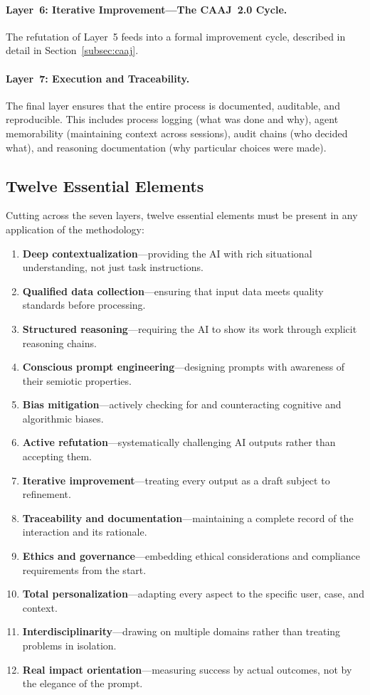 \documentclass[11pt,a4paper]{article}
\begin{document}
\paragraph{Layer~6: Iterative Improvement---The CAAJ~2.0 Cycle.} The refutation of Layer~5 feeds into a formal improvement cycle, described in detail in Section~\ref{subsec:caaj}.

\paragraph{Layer~7: Execution and Traceability.} The final layer ensures that the entire process is documented, auditable, and reproducible. This includes process logging (what was done and why), agent memorability (maintaining context across sessions), audit chains (who decided what), and reasoning documentation (why particular choices were made).

\subsection{Twelve Essential Elements}

Cutting across the seven layers, twelve essential elements must be present in any application of the methodology:

\begin{enumerate}[label=\arabic*.]
    \item \textbf{Deep contextualization}---providing the AI with rich situational understanding, not just task instructions.
    \item \textbf{Qualified data collection}---ensuring that input data meets quality standards before processing.
    \item \textbf{Structured reasoning}---requiring the AI to show its work through explicit reasoning chains.
    \item \textbf{Conscious prompt engineering}---designing prompts with awareness of their semiotic properties.
    \item \textbf{Bias mitigation}---actively checking for and counteracting cognitive and algorithmic biases.
    \item \textbf{Active refutation}---systematically challenging AI outputs rather than accepting them.
    \item \textbf{Iterative improvement}---treating every output as a draft subject to refinement.
    \item \textbf{Traceability and documentation}---maintaining a complete record of the interaction and its rationale.
    \item \textbf{Ethics and governance}---embedding ethical considerations and compliance requirements from the start.
    \item \textbf{Total personalization}---adapting every aspect to the specific user, case, and context.
    \item \textbf{Interdisciplinarity}---drawing on multiple domains rather than treating problems in isolation.
    \item \textbf{Real impact orientation}---measuring success by actual outcomes, not by the elegance of the prompt.
\end{enumerate}
\end{document}
